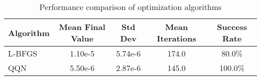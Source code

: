\begin{table}[htbp]
\centering
\caption{Performance comparison of optimization algorithms}
\label{tab:performance}
\begin{tabular}{lcccc}
\toprule
Algorithm & Mean Final Value & Std Dev & Mean Iterations & Success Rate \\
\midrule
L-BFGS & 1.10e-5 & 5.74e-6 & 174.0 & 80.0\% \\
QQN & 5.50e-6 & 2.87e-6 & 145.0 & 100.0\% \\
\bottomrule
\end{tabular}
\end{table}
